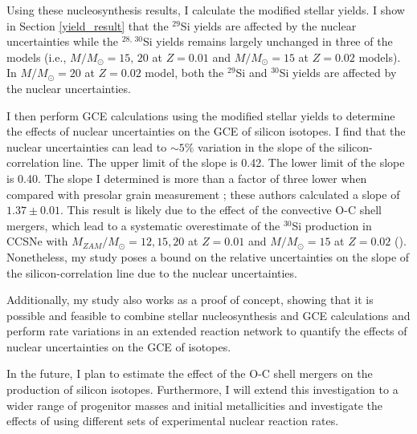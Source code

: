 \documentclass{brandeis-thesis3.2}
\def \msun {M_{\odot}}
\newcommand{\iso}[2]{$^{#1}${#2}}
\begin{document}
Using these nucleosynthesis results, I calculate the modified stellar yields. I show in Section \ref{yield_result} that the \iso{29}{Si} yields are affected by the nuclear uncertainties while the \iso{28,\, 30}{Si} yields remains largely unchanged in three of the models (i.e., $M/\msun = 15,\, 20$ at $Z=0.01$ and $M/\msun = 15$ at $Z=0.02$ models). In $M/\msun = 20$ at $Z=0.02$ model, both the \iso{29}{Si} and \iso{30}{Si} yields are affected by the nuclear uncertainties.

I then perform GCE calculations using the modified stellar yields to determine the effects of nuclear uncertainties on the GCE of silicon isotopes. I find that the nuclear uncertainties can lead to $\sim5\%$ variation in the slope of the silicon-correlation line. The upper limit of the slope is 0.42. The lower limit of the slope is 0.40. The slope I determined is more than a factor of three lower when compared with presolar grain measurement \citep{Zinner2007}; these authors calculated a slope of $1.37\pm 0.01$. This result is likely due to the effect of the convective O-C shell mergers, which lead to a systematic overestimate of the \iso{30}{Si} production in CCSNe with $M_{ZAM}/\msun = 12, 15, 20$ at $Z=0.01$ and $M/\msun = 15$ at $Z=0.02$ (\citealt{Ritter_2018}). Nonetheless, my study poses a bound on the relative uncertainties on the slope of the silicon-correlation line due to the nuclear uncertainties. 

Additionally, my study also works as a proof of concept, showing that it is possible and feasible to combine stellar nucleosynthesis and GCE calculations and perform rate variations in an extended reaction network to quantify the effects of nuclear uncertainties on the GCE of isotopes. 

In the future, I plan to estimate the effect of the O-C shell mergers on the production of silicon isotopes. Furthermore, I will extend this investigation to a wider range of progenitor masses and initial metallicities and investigate the effects of using different sets of experimental nuclear reaction rates. 







\singlespacing

\end{document}
